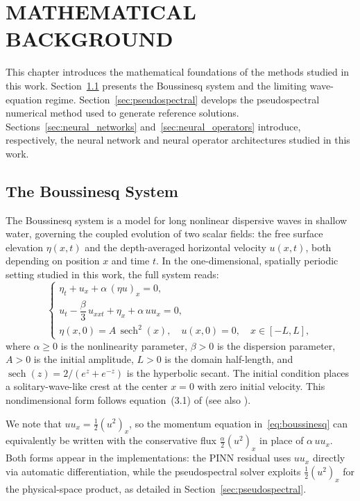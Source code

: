 
\chapter{MATHEMATICAL BACKGROUND}

This chapter introduces the mathematical foundations of the methods studied in this work. Section~\ref{sec:boussinesq} presents the Boussinesq system and the limiting wave-equation regime. Section~\ref{sec:pseudospectral} develops the pseudospectral numerical method used to generate reference solutions. Sections~\ref{sec:neural_networks} and~\ref{sec:neural_operators} introduce, respectively, the neural network and neural operator architectures studied in this work.

\section{The Boussinesq System}
\label{sec:boussinesq}

The Boussinesq system is a model for long nonlinear dispersive waves in shallow water, governing the coupled evolution of two scalar fields: the free surface elevation $\eta(x,t)$ and the depth-averaged horizontal velocity $u(x,t)$, both depending on position $x$ and time $t$. In the one-dimensional, spatially periodic setting studied in this work, the full system reads:
\begin{equation}\label{eq:boussinesq}
\begin{cases}
    \eta_t + u_x + \alpha\,(\eta u)_x = 0, \\[4pt]
    u_t - \dfrac{\beta}{3}\,u_{xxt} + \eta_x + \alpha\,u u_x = 0, \\[4pt]
    \eta(x,0) = A\,\operatorname{sech}^2(x), \quad u(x,0) = 0, \quad x \in [-L,L],
\end{cases}
\end{equation}
where $\alpha \geq 0$ is the nonlinearity parameter, $\beta > 0$ is the dispersion parameter, $A > 0$ is the initial amplitude, $L > 0$ is the domain half-length, and $\operatorname{sech}(z) = 2/(e^z + e^{-z})$ is the hyperbolic secant. The initial condition places a solitary-wave-like crest at the center $x = 0$ with zero initial velocity. This nondimensional form follows equation~(3.1) of \textcite{martins2023} (see also \textcite{martins2024}).

We note that $u u_x = \frac{1}{2}(u^2)_x$, so the momentum equation in~\eqref{eq:boussinesq} can equivalently be written with the conservative flux $\frac{\alpha}{2}(u^2)_x$ in place of $\alpha\, u u_x$. Both forms appear in the implementations: the PINN residual uses $u u_x$ directly via automatic differentiation, while the pseudospectral solver exploits $\frac{1}{2}(u^2)_x$ for the physical-space product, as detailed in Section~\ref{sec:pseudospectral}.

